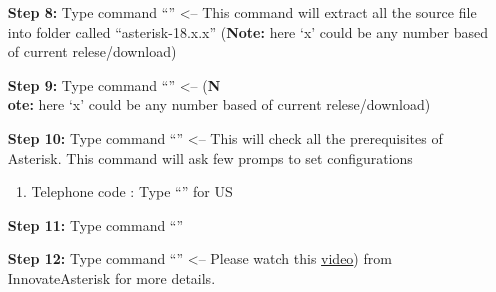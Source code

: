 \begin{itemize}[leftmargin=1.7cm]
			\item[\textbf{Step 8:}] Type command ``{\selectfont{tar -xvf asterisk-18-cu\\rrent.tar.gz}}'' <-- This command will extract all the source file into folder called ``asterisk-18.x.x'' (\textbf{Note:} here `x' could be any number based of current relese/download)
			
			\item[\textbf{Step 9:}] Type command ``{\selectfont{cd asterisk-18.x.x}}'' <-- (\textbf{N\\ote:} here `x' could be any number based of current relese/download)
			
			\item[\textbf{Step 10:}] Type command ``{\selectfont{sudo contrib/scripts/ins\\tall\_prereq install}}'' <-- This will check all the prerequisites of Asterisk. This command will ask few promps to set configurations
					\begin{enumerate}
						\item Telephone code : Type ``{\selectfont{1}}'' for US
					\end{enumerate}
			\item[\textbf{Step 11:}] Type command ``{\selectfont{sudo ./configure --libdir=\\/usr/lib --with-pjproject-bundled}}''
			
			\item[\textbf{Step 12:}] Type command ``{\selectfont{sudo make menuselect}}'' <-- Please watch this \href{https://www.youtube.com/watch?v=52sEPVPV9JE&list=PLruX0IBTg1G4Auvo5YhoJKgskmMP7b8bJ&index=4&ab_channel=InnovateAsterisk}{video}) from InnovateAsterisk for more details.


\end{itemize}
